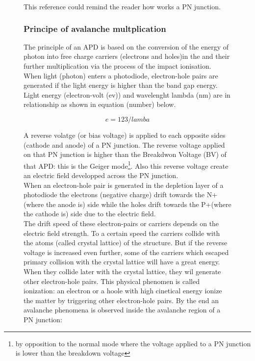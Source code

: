 \documentclass[a4paper, 11pt]{report}%
\begin{document}
\begin{figure}[!hbtp]
  This reference could remind the reader how works a PN junction.
  
  \subsubsection{Principe of avalanche multplication}
  
  The principle of an APD is based on the conversion of the energy of photon into free charge carriers (electrons and 
  holes)in the 
  and their further multiplication via the process of the impact ionisation. 
  \\
  When light (photon) enters a photodiode, electron-hole pairs are generated if 
  the light energy is higher than the band gap energy. Light energy (electron-volt (ev)) and wavelenght lambda (nm)
  are in relationship as shown in equation (number) below. 
  
  \begin{equation}
   e= 123/lamba
  \end{equation}
  
  A reverse volatge (or bias voltage) is applied to each opposite sides (cathode and anode) of a PN junction. The reverse voltage applied on that PN junction
  is higher than the Breakdwon Voltage (BV) of that 
  APD: this is the Geiger mode\footnote{by opposition to the normal mode where the voltage applied to a PN junction is 
  lower than the breakdown voltage}. 
  Also this reverse voltage create an electric field developped across the PN junction.\\
  When an electron-hole pair is generated in the depletion layer of a photodiode 
  the electrons (negative charge) drift towards the N+ (where the anode is) side while the holes drift towards the P+(where the cathode is)
  side due to the electric field. 
  \\
  
  The drift speed of these electron-pairs or carriers depends on the electric field strength. To a certain speed
  the carriers collide with the atoms (called crystal lattice) of the structure. But if the reverse voltage is increased even further, 
  some of the carriers which escaped primary collision with the crystal lattice will have a great energy.\\
  When they collide later with the crystal lattice, they wil generate other electron-hole pairs. This physical phenomen is called ionization:
  an electron or a hoole with high cinetical energy ionize the matter by triggering other electron-hole pairs. 
  By the end an avalanche phenomena is observed inside the avalanche region of a PN junction:
  

\end{figure}
\end{document}
